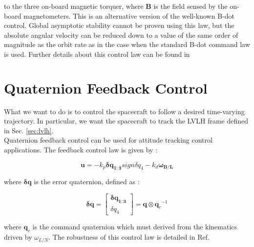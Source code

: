 \documentclass[11pt,a4paper]{report}
\begin{document}
to the three on-board magnetic torquer, where $\mathbf{B}$ is the field sensed by the on-board magnetometers. This is an alternative version of the well-known B-dot control. Global asymptotic stability cannot be proven using this law, but the absolute angular velocity can be reduced down to a value of the same order of magnitude as the orbit rate as in the case when the standard B-dot command law is used. 
Further details about this control law can be found in \cite{Ref:Articles:Lovera}

\section{Quaternion Feedback Control}
What we want to do is to control the spacecraft to follow a desired time-varying trajectory. In particular, we want the spacecraft to track the LVLH frame defined in Sec. \ref{sec:lvlh}.\\
Quaternion feedback control can be used for attitude tracking control applications.
The feedback control law is given by :

\begin{equation}
\label{eq:idealcontrol}
 \mathbf{u} = -\mathit{k_p}\mathbf{\delta q_{1:3}}sign\mathit{\delta q_{4}} - \mathit{k_d}\mathbf{\omega_{B/L}}
\end{equation}

where $\mathbf{\delta q}$ is the error quaternion, defined as :

\begin{equation}
 \mathbf{\delta q} =                                       
                      \begin{bmatrix}
                           \mathbf{\delta q_{1:3}} \\
                           \mathit{\delta q_{4}}
                      \end{bmatrix}
                                                             = \mathbf{q} \otimes {\mathbf{q}_{c}}^{-1}
\end{equation}

where $\mathbf{q}_{c}$ is the command quaternion which must derived from the kinematics driven by $\omega_{L/N}$.
The robustness of this control law is detailed in Ref. \cite{Ref:Books:Fundamentals}
\end{document}
